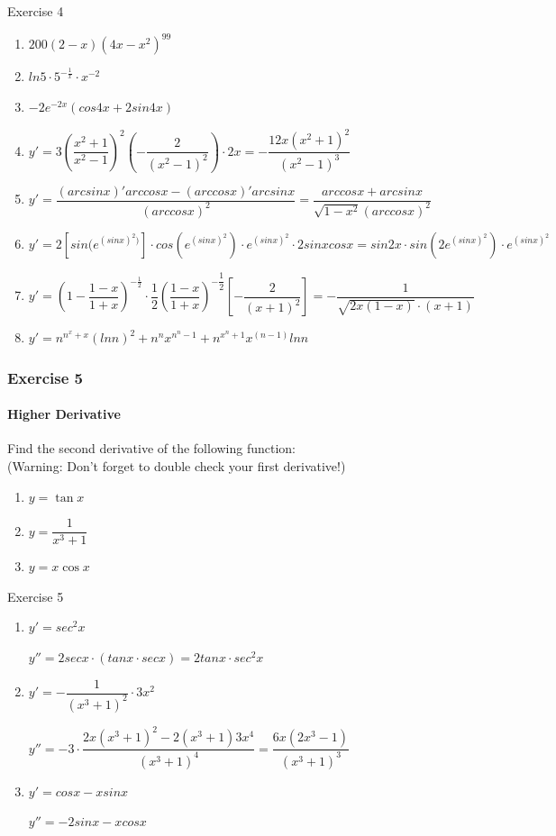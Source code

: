 \begin{frame}{Exercise 4}
    \begin{enumerate}
        \item $200(2-x)(4x-x^2)^{99}$
        \item $ln5\cdot5^{-\frac{1}{x}}\cdot x^{-2}$
        \item $-2e^{-2x}(cos4x + 2sin4x)$
        \item $y' = 3(\dfrac{x^2+1}{x^2-1})^2(-\dfrac{2}{(x^2 - 1)^2})\cdot 2x = -\dfrac{12x(x^2+1)^2}{(x^2-1)^3}$
        \item $y' = \dfrac{(arcsinx)'arccosx - (arccosx)'arcsinx}{(arccosx)^2} = \dfrac{arccosx + arcsinx}{\sqrt{1-x^2}(arccosx)^2}$
        \item $y' = 2[sin(e^{(sinx)^2)}]\cdot cos(e^{(sinx)^2}) \cdot e^{(sinx)^2} \cdot 2sinxcosx = sin2x \cdot sin(2e^{(sinx)^2})\cdot e^{(sinx)^2}$
        \item $y' = (1-\dfrac{1-x}{1+x})^{-\frac{1}{2}}\cdot \dfrac{1}{2}(\dfrac{1-x}{1+x})^{-\dfrac{1}{2}}[-\dfrac{2}{(x+1)^2}] = -\dfrac{1}{\sqrt{2x(1-x)}\cdot (x+1)}$
        \item $y' = n^{n^x + x}(lnn)^2 + n^nx^{n^n -1} + n^{x^n + 1}x^{(n-1)}lnn$
    \end{enumerate}
\end{frame}



\begin{frame}
    \frametitle{Exercise 5}
    \framesubtitle{Higher Derivative}
    Find the second derivative of the following function:\\
    (\alert{Warning}: Don't forget to double check your first derivative!)
    \begin{enumerate}
        \item $y = \tan{x}$
        \item $y = \dfrac{1}{x^{3} + 1}$
        \item $y = x\cos{x}$
    \end{enumerate}
\end{frame}



\begin{frame}{Exercise 5}
    \begin{enumerate}
        \item $y' = sec^2x$

              $y'' = 2secx \cdot (tanx \cdot secx) = 2tanx \cdot sec^2x$
        \item $y' = -\dfrac{1}{(x^3 + 1)^2}\cdot 3x^2$

              $y'' = -3 \cdot \dfrac{2x(x^3+1)^2 - 2(x^3+1)3x^4}{(x^3 + 1)^4} = \dfrac{6x(2x^3 - 1)}{(x^3 + 1)^3}$
        \item $y' = cosx - xsinx$

              $y'' = -2sinx - xcosx$
    \end{enumerate}
\end{frame}



